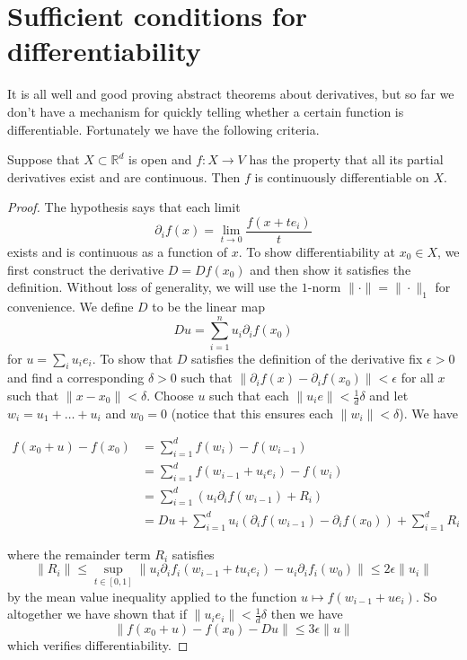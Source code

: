 \documentclass[twoside, a4paper, 10pt]{amsart}
\begin{document}
\section{Sufficient conditions for differentiability}

It is all well and good proving abstract theorems about derivatives, but so far we don't have a mechanism for quickly telling whether a certain function is differentiable. Fortunately we have the following criteria. 

\begin{prop} Suppose that $X \subset \mathbb{R}^d$ is open and $f:X \to V$ has the property that all its partial derivatives exist and are continuous. Then $f$ is continuously differentiable on $X$.

\end{prop}

\begin{proof} The hypothesis says that each limit $$\partial_if(x) = \lim_{t \to 0} \frac{f(x+te_i)}{t}$$ exists and is continuous as a function of $x$. To show differentiability at $x_0 \in X$, we first construct the derivative $D= Df (x_0) $ and then show it satisfies the definition. Without loss of generality, we will use the $1$-norm $\| \cdot \| = \| \cdot \|_1$ for convenience. We define $D$ to be the linear map $$Du = \sum_{i=1}^n u_i \partial_i f (x_0)$$ for $u = \sum_i u_i e_i$. To show that $D$ satisfies the definition of the derivative fix $\epsilon >0$ and find a corresponding $\delta >0$ such that $\| \partial_i f(x) - \partial_if (x_0) \| < \epsilon$ for all $x$ such that $\|x - x_0\| < \delta$. Choose $u$ such that each $\|u_ie\| < \frac{1}{d} \delta$ and let $w_i = u_1 + \ldots + u_i$ and $w_0 = 0$ (notice that this ensures each $\|w_i \| < \delta$). We have 

\begin{align*} f(x_0 + u) - f(x_0) &= \sum_{i=1}^d f(w_i) - f(w_{i-1}) \\ &= \sum_{i=1}^d f(w_{i-1} + u_i e_i) - f(w_{i}) \\ &= \sum_{i=1}^d (u_i \partial_i f(w_{i-1}) + R_i) \\ &= Du + \sum_{i=1}^d u_i \left(\partial_i f(w_{i-1}) - \partial_i f(x_0) \right) + \sum_{i=1}^d R_i \end{align*}

where the remainder term $R_i$ satisfies $$\|R_i \| \leq \sup_{t \in [0,1]} \| u_i \partial_i f_i (w_{i-1} + tu_ie_i) - u_i \partial_i f_i (w_0)\| \leq 2 \epsilon \|u_i\|$$ by the mean value inequality applied to the function $u \mapsto f(w_{i-1} + ue_i)$. So altogether we have shown that if $\|u_i e_i\| < \frac{1}{d}\delta$ then we have $$\|f(x_0 + u) -f(x_0) - Du\| \leq 3\epsilon \|u\|$$ which verifies differentiability. \end{proof}
\end{document}

